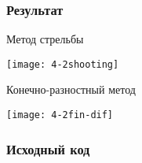 \subsubsection{Результат}
Метод стрельбы
\begin{center}
\texttt{[image: 4-2shooting]}
\end{center}

Конечно-разностный метод
\begin{center}
\texttt{[image: 4-2fin-dif]}
\end{center}
\pagebreak

\subsubsection{Исходный код}

\pagebreak
